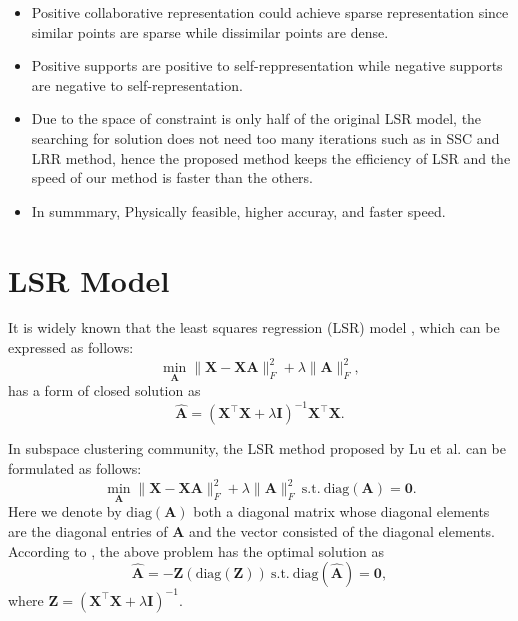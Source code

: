 \documentclass[10pt,twocolumn,letterpaper]{article}
\begin{document}
\begin{itemize}
\item Positive collaborative representation could achieve sparse representation since similar points are sparse while dissimilar points are dense.

\item Positive supports are positive to self-reppresentation while negative supports are negative to self-representation.

\item Due to the space of constraint is only half of the original LSR model, the searching for solution does not need too many iterations such as in SSC and LRR method, hence the proposed method keeps the efficiency of LSR and the speed of our method is faster than the others.

\item In summmary, Physically feasible, higher accuray, and faster speed.
\end{itemize}

\section{LSR Model}
It is widely known that the least squares regression (LSR) model \cite{prml}, which can be expressed as follows:
\begin{equation}
\label{e1}
\min_{\bm{A}}
\|
\bm{X}
-
\bm{X}\bm{A}
\|_{F}^{2}
+
\lambda
\|
\bm{A}
\|_{F}^{2}
,
\end{equation}
has a form of closed solution as
\begin{equation}
\label{e2}
\hat{\bm{A}}
=
(\bm{X}^{\top}\bm{X}+\lambda\bm{I})^{-1}\bm{X}^{\top}\bm{X}.
\end{equation}


In subspace clustering community, the LSR method \cite{lsr} proposed by Lu et al. can be formulated as follows:
\begin{equation}
\label{e3}
\min_{\bm{A}}
\|
\bm{X}
-
\bm{X}\bm{A}
\|_{F}^{2}
+
\lambda
\|
\bm{A}
\|_{F}^{2}
\ 
\text{s.t.}
\ 
\text{diag}(\bm{A})=\bm{0}.
\end{equation}
Here we denote by $\text{diag}(\bm{A})$ both a diagonal matrix whose diagonal elements are the diagonal entries of $\bm{A}$ and the vector consisted of the diagonal elements. According to \cite{lsr}, the above problem has the optimal solution as 
\begin{equation}
\label{e4}
\hat{\bm{A}}
=
-\bm{\bm{Z}}(\text{diag}(\bm{Z}))
\
\text{s.t.} 
\
\text{diag}(\hat{\bm{A}})=\bm{0}
,
\end{equation}
where $\bm{Z}=(\bm{X}^{\top}\bm{X}+\lambda\bm{I})^{-1}$.
\end{document}
